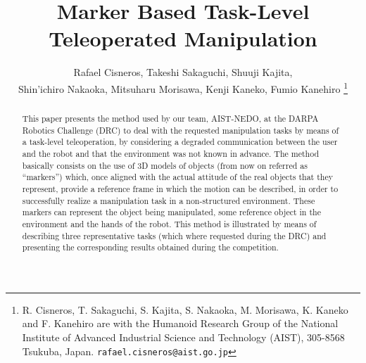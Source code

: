 \documentclass[letterpaper, 10 pt, conference]{ieeeconf}
\begin{document}
	\title{\LARGE \bf Marker Based Task-Level Teleoperated Manipulation}

	\author{Rafael Cisneros, Takeshi Sakaguchi, Shuuji Kajita, \\
					Shin'ichiro Nakaoka, Mitsuharu Morisawa, Kenji Kaneko, Fumio Kanehiro
	\thanks{R. Cisneros, T. Sakaguchi, S. Kajita, S. Nakaoka, M. Morisawa, K. Kaneko and F. Kanehiro
					are with the Humanoid Research Group of the National Institute of Advanced Industrial Science
					and Technology (AIST), 305-8568 Tsukuba, Japan. {\tt\small rafael.cisneros@aist.go.jp}}}
  
	\maketitle

	\thispagestyle{empty}
	\pagestyle{empty}

	\begin{abstract}
		This paper presents the method used by our team, AIST-NEDO, at the DARPA Robotics Challenge (DRC) to deal with
		the requested manipulation tasks by means of a task-level teleoperation, by considering a degraded communication
		between the user and the robot and that the environment was not known in advance.
		The method basically consists on the use of 3D models of objects (from now on referred as ``markers'') which,
		once aligned with the actual attitude of the real objects that they represent, provide a reference frame in
		which the motion can be described, in order to successfully realize a manipulation task in a non-structured
		environment.
		These markers can represent the object being manipulated, some reference object in the environment and the
		hands of the robot.
		This method is illustrated by means of describing three representative tasks (which where requested during the DRC)
		and presenting the corresponding results obtained during the competition.
	\end{abstract}

	
	
		
		
	
		
	
		
	

	
		
	
	
	
	
	
	
	
\end{document}
